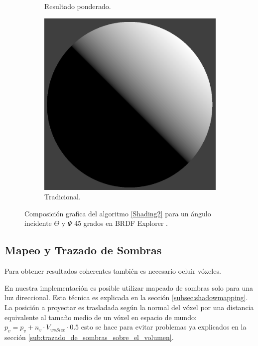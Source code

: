 \begin{figure}[H]
\begin{subfigure}[t]{0.2\textwidth}
		\caption*{Resultado ponderado.}
	\end{subfigure}%
	\begin{subfigure}[t]{0.2\textwidth}
		\centering
		\captionsetup{justification=centering}
		\includegraphics[width=\linewidth]{media/nDotLT.png}
		\caption*{Tradicional.}
	\end{subfigure}%
	\caption{Composición grafica del algoritmo \ref{Shading2} para un ángulo incidente $\Theta$ y $\Psi$ 45 grados en BRDF Explorer \cite{brdf_explorer}.}
	\label{fig:compositve_vshading}
\end{figure}

\subsection{Mapeo y Trazado de Sombras}

Para obtener resultados coherentes también es necesario ocluir vóxeles. 

En nuestra implementación es posible utilizar mapeado de sombras solo para una luz direccional. Esta técnica es explicada en la sección \ref{subsec:shadowmapping}. La posición a proyectar es trasladada según la normal del vóxel por una distancia equivalente al tamaño medio de un vóxel en espacio de mundo: $p_{v} = p_{v} + n_{v}\cdot V_{wsSize} \cdot 0.5$ esto se hace para evitar problemas ya explicados en la sección \ref{sub:trazado_de_sombras_sobre_el_volumen}.

